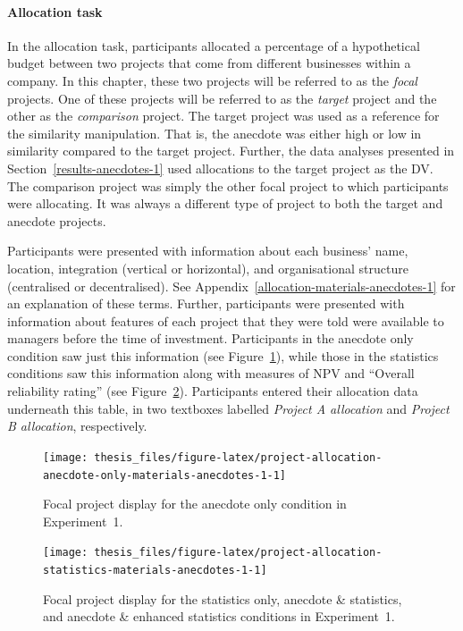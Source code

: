 \documentclass[a4paper, nobind, dvipsnames]{templates/ociamthesis}
\theoremstyle{definition}
\theoremstyle{definition}
\theoremstyle{definition}
\theoremstyle{definition}
\theoremstyle{remark}
\begin{document}
\paragraph{Allocation task}

In the allocation task, participants allocated a percentage of a hypothetical
budget between two projects that come from different businesses within a
company. In this chapter, these two projects will be referred to as the \emph{focal}
projects. One of these projects will be referred to as the \emph{target} project and
the other as the \emph{comparison} project. The target project was used as a
reference for the similarity manipulation. That is, the anecdote was either high
or low in similarity compared to the target project. Further, the data analyses
presented in Section~\ref{results-anecdotes-1} used allocations to the target
project as the DV. The comparison project was simply the other focal project to
which participants were allocating. It was always a different type of project to
both the target and anecdote projects.

Participants were presented with information about each business' name,
location, integration (vertical or horizontal), and organisational structure
(centralised or decentralised). See
Appendix~\ref{allocation-materials-anecdotes-1} for an explanation of these
terms. Further, participants were presented with information about features of
each project that they were told were available to managers before the time of
investment. Participants in the anecdote only condition saw just this
information (see
Figure~\ref{fig:project-allocation-anecdote-only-materials-anecdotes-1}), while
those in the statistics conditions saw this information along with measures of
NPV and ``Overall reliability rating'' (see
Figure~\ref{fig:project-allocation-statistics-materials-anecdotes-1}).
Participants entered their allocation data underneath this table, in two
textboxes labelled \emph{Project A allocation} and \emph{Project B allocation},
respectively.



\begin{figure}
\texttt{[image: thesis\_files/figure-latex/project-allocation-anecdote-only-materials-anecdotes-1-1]} \caption{Focal project display for the anecdote only condition in Experiment~1.}\label{fig:project-allocation-anecdote-only-materials-anecdotes-1}
\end{figure}



\begin{figure}
\texttt{[image: thesis\_files/figure-latex/project-allocation-statistics-materials-anecdotes-1-1]} \caption{Focal project display for the statistics only, anecdote \& statistics, and anecdote \& enhanced statistics conditions in Experiment~1.}\label{fig:project-allocation-statistics-materials-anecdotes-1}
\end{figure}
\end{document}
